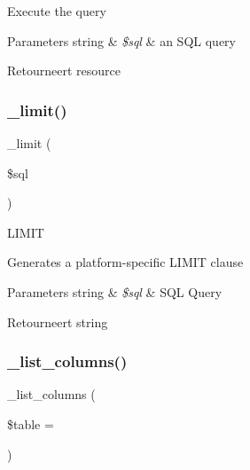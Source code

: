 Execute the query


\begin{DoxyParams}[1]{Parameters}
string & {\em \$sql} & an S\+QL query \\
\hline
\end{DoxyParams}
\begin{DoxyReturn}{Retourneert}
resource 
\end{DoxyReturn}
\mbox{\label{class_c_i___d_b__postgre__driver_a3a02ea06541b8ecc25a33a61651562c8}} 
\subsubsection{\texorpdfstring{\_limit()}{\_limit()}}
{\footnotesize\ttfamily \+\_\+limit (\begin{DoxyParamCaption}\item[{}]{\$sql }\end{DoxyParamCaption})\hspace{0.3cm}{\ttfamily [protected]}}

L\+I\+M\+IT

Generates a platform-\/specific L\+I\+M\+IT clause


\begin{DoxyParams}[1]{Parameters}
string & {\em \$sql} & S\+QL Query \\
\hline
\end{DoxyParams}
\begin{DoxyReturn}{Retourneert}
string 
\end{DoxyReturn}
\mbox{\label{class_c_i___d_b__postgre__driver_a7ccb7f9c301fe7f0a9db701254142b63}} 
\subsubsection{\texorpdfstring{\_list\_columns()}{\_list\_columns()}}
{\footnotesize\ttfamily \+\_\+list\+\_\+columns (\begin{DoxyParamCaption}\item[{}]{\$table = {\ttfamily \textquotesingle{}\textquotesingle{}} }\end{DoxyParamCaption})\hspace{0.3cm}{\ttfamily [protected]}}

